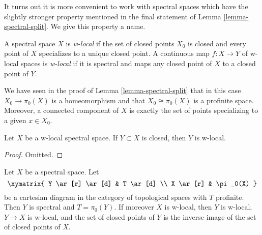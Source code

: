 \noindent
It turns out it is more convenient to work with spectral
spaces which have the slightly stronger property mentioned in
the final statement of Lemma \ref{lemma-spectral-split}.
We give this property a name.

\begin{definition}
\label{definition-w-local}
A spectral space $X$ is {\it w-local} if the set of closed points $X_0$
is closed and every point of $X$ specializes to a unique closed point.
A continuous map $f : X \to Y$ of w-local spaces is {\it w-local}
if it is spectral and maps any closed point of $X$ to a closed point of $Y$.
\end{definition}

\noindent
We have seen in the proof of Lemma \ref{lemma-spectral-split}
that in this case $X_0 \to \pi_0(X)$ is a homeomorphism and that
$X_0 \cong \pi_0(X)$ is a profinite space. Moreover, a connected
component of $X$ is exactly the set of points specializing to
a given $x \in X_0$.

\begin{lemma}
\label{lemma-closed-subspace-w-local}
Let $X$ be a w-local spectral space. If $Y \subset X$ is closed,
then $Y$ is w-local.
\end{lemma}

\begin{proof}
Omitted.
\end{proof}

\begin{lemma}
\label{lemma-silly}
Let $X$ be a spectral space. Let
$$
\xymatrix{
Y \ar[r] \ar[d] & T \ar[d] \\
X \ar[r] & \pi_0(X)
}
$$
be a cartesian diagram in the category of topological spaces
with $T$ profinite. Then $Y$ is spectral and $T = \pi_0(Y)$.
If moreover $X$ is w-local, then $Y$ is w-local, $Y \to X$ is w-local,
and the set of closed points of $Y$ is the inverse image of the
set of closed points of $X$.
\end{lemma}

